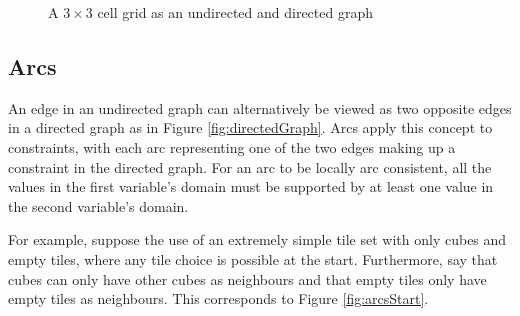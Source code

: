 \begin{figure}[H]
{
        \label{fig:directedGraph}
    }

    \caption{A \(3\times3\) cell grid as an undirected and directed graph}
    \label{fig:graphs}
\end{figure}

\subsection{Arcs}
An edge in an undirected graph can alternatively be viewed as two opposite edges in a directed graph as in Figure \ref{fig:directedGraph}. Arcs apply this concept to constraints, with each arc representing one of the two edges making up a constraint in the directed graph. For an arc to be locally arc consistent, all the values in the first variable's domain must be supported by at least one value in the second variable's domain.

For example, suppose the use of an extremely simple tile set with only cubes and empty tiles, where any tile choice is possible at the start. Furthermore, say that cubes can only have other cubes as neighbours and that empty tiles only have empty tiles as neighbours. This corresponds to Figure \ref{fig:arcsStart}.

